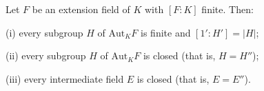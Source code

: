 Let $F$ be an extension field of $K$ with $[F : K]$ finite. Then:

(i) every subgroup $H$ of $\mathrm{Aut}_K F$ is finite and $[1' : H'] = |H|$;

(ii) every subgroup $H$ of $\mathrm{Aut}_K F$ is closed (that is, $H = H''$);

(iii) every intermediate field $E$ is closed (that is, $E = E''$).
